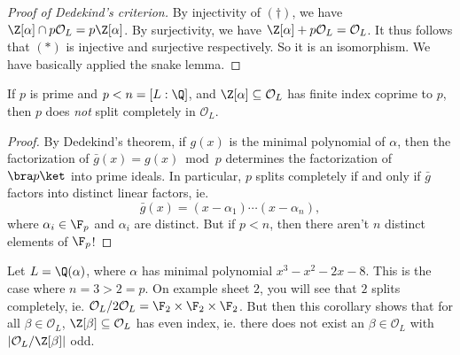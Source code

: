 \documentclass[a4paper]{article}
\begin{document}
\begin{proof}[Proof of Dedekind's criterion]
  By injectivity of $(\dagger)$, we have $\Z[\alpha] \cap p\mathcal{O}_L = p \Z[\alpha]$. By surjectivity, we have $\Z[\alpha] + p\mathcal{O}_L = \mathcal{O}_L$. It thus follows that $(*)$ is injective and surjective respectively. So it is an isomorphism. We have basically applied the snake lemma.
\end{proof}

\begin{cor}
  If $p$ is prime and $p < n = [L:\Q]$, and $\Z[\alpha] \subseteq \mathcal{O}_L$ has finite index coprime to $p$, then $p$ does \emph{not} split completely in $\mathcal{O}_L$.
\end{cor}

\begin{proof}
  By Dedekind's theorem, if $g(x)$ is the minimal polynomial of $\alpha$, then the factorization of $\bar{g}(x) = g(x)\bmod p$ determines the factorization of $\bra p\ket$ into prime ideals. In particular, $p$ splits completely if and only if $\bar{g}$ factors into distinct linear factors, ie.
  \[
    \bar{g}(x) = (x - \alpha_1) \cdots (x- \alpha_n),
  \]
  where $\alpha_i \in \F_p$ and $\alpha_i$ are distinct. But if $p < n$, then there aren't $n$ distinct elements of $\F_p$!
\end{proof}

\begin{eg}
  Let $L = \Q(\alpha)$, where $\alpha$ has minimal polynomial $x^3 - x^2 - 2x - 8$. This is the case where $n = 3 > 2 = p$. On example sheet $2$, you will see that $2$ splits completely, ie. $\mathcal{O}_L/2\mathcal{O}_L = \F_2 \times \F_2 \times \F_2$. But then this corollary shows that for all $\beta \in \mathcal{O}_L$, $\Z[\beta] \subseteq \mathcal{O}_L$ has even index, ie. there does not exist an $\beta \in \mathcal{O}_L$ with $|\mathcal{O}_L/\Z[\beta]|$ odd.
\end{eg}

%
\end{document}
